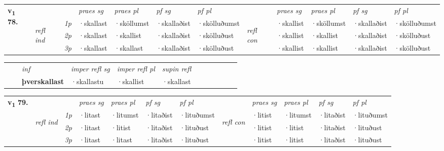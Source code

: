 \begin{tabular}{llllllllllll} \toprule
\multirow{4}{*}{{{\textbf{v{\textsubscript{1}}} \Large{\textbf{78.}}}}}  & &   &  \textit{praes sg}  & \textit{praes pl}  &\textit{pf sg} & \textit{pf pl} &  &  \textit{praes sg}  & \textit{praes pl}  & \textit{pf sg} & \textit{pf pl } \\*
	\cmidrule{4-7} \cmidrule{9-12}
 &\multirow{3}{*}{\begin{turn}{90}\textit{refl ind}\end{turn}} & {\textit{1p}} & ·skallast & ·sköllumst    & ·skallaðist & ·skölluðumst & \multirow{3}{*}{\begin{turn}{90}\textit{refl con}\end{turn}}  &·skallist & ·sköllumst & ·skallaðist & ·skölluðumst\\*
 &&  {\textit{2p}} &  ·skallast  & ·skallist   & ·skallaðist & ·skölluðust & &·skallist & ·skallist & ·skallaðist & ·skölluðust \\*
& &  {\textit{3p}} & ·skallast & ·skallast   & ·skallaðist & ·skölluðust & & ·skallist & ·skallist& ·skallaðist & ·skölluðust  \\*
\cmidrule{4-7} \cmidrule{9-12}
\end{tabular}


\begin{tabular}{llllllllllll}
 & & \textit{inf}   & \textit{imper refl sg} & \textit{imper refl pl}   & \textit{supin refl}      \\*
  & & \textbf{þverskallast}    & ·skallastu & ·skallist   & ·skallast  \\*
\cmidrule{1-12}
\end{tabular}



\begin{tabular}{llllllllllll} \toprule
\multirow{4}{*}{{{\textbf{v{\textsubscript{1}}} \Large{\textbf{79.}}}}}  & &   &  \textit{praes sg}  & \textit{praes pl}  &\textit{pf sg} & \textit{pf pl} &  &  \textit{praes sg}  & \textit{praes pl}  & \textit{pf sg} & \textit{pf pl } \\*
	\cmidrule{4-7} \cmidrule{9-12}
 &\multirow{3}{*}{\begin{turn}{90}\textit{refl ind}\end{turn}} & {\textit{1p}} & ·litast & ·litumst    & ·litaðist & ·lituðumst & \multirow{3}{*}{\begin{turn}{90}\textit{refl con}\end{turn}}  &·litist & ·litumst & ·litaðist & ·lituðumst\\*
 &&  {\textit{2p}} &  ·litast  & ·litist   & ·litaðist & ·lituðust & &·litist & ·litist & ·litaðist & ·lituðust \\*
& &  {\textit{3p}} & ·litast & ·litast   & ·litaðist & ·lituðust & & ·litist & ·litist& ·litaðist & ·lituðust  \\*
\cmidrule{4-7} \cmidrule{9-12}
\end{tabular}


